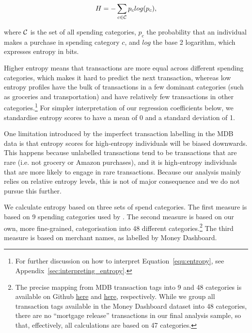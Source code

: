 \begin{equation}
\label{equ:entropy}
H = -\sum_{c \in \mathcal{C}}{p_c}log(p_c),
\end{equation}

\noindent where $\mathcal{C}$ is the set of all spending categories, $p_c$ the
probability that an individual makes a purchase in spending category $c$, and
$log$ the base 2 logarithm, which expresses entropy in bits.

Higher entropy means that transactions are more equal across different spending
categories, which makes it hard to predict the next transaction, whereas low
entropy profiles have the bulk of transactions in a few dominant categories
(such as groceries and transportation) and have relatively few transactions in
other categories.\footnote{For further discussion on how to interpret
Equation~\ref{equ:entropy}, see Appendix~\ref{sec:interpreting_entropy}.} For
simpler interpretation of our regression coefficients below, we standardise
entropy scores to have a mean of 0 and a standard deviation of 1.

One limitation introduced by the imperfect transaction labelling in the
MDB data is that entropy scores for high-entropy individuals will be biased
downwards. This happens because unlabelled transactions tend to be transactions
that are rare (i.e. not grocery or Amazon purchases), and it is high-entropy
individuals that are more likely to engage in rare transactions. Because our
analysis mainly relies on relative entropy levels, this is not of major
consequence and we do not pursue this further.

We calculate entropy based on three sets of spend categories. The first measure
is based on 9 spending categories used by \citet{muggleton2020evidence}. The
second measure is based on our own, more fine-grained, categorisation into 48
different categories.\footnote{The precise mapping from MDB transaction tags
    into 9 and 48 categories is available on Github
    \href{https://github.com/fabiangunzinger/entropy/blob/7fa9c565bf8959ea92a9d4fe2245da0864e19c27/src/data/txn_classifications.py\#L249}{here}
    and
    \href{https://github.com/fabiangunzinger/entropy/blob/7fa9c565bf8959ea92a9d4fe2245da0864e19c27/src/data/txn_classifications.py\#L503}{here},
    respectively. While we group all transaction tags available in the Money
    Dashboard dataset into 48 categories, there are no ``mortgage release''
transactions in our final analysis sample, so that, effectively, all
calculations are based on 47 categories.} The third measure is based on
merchant names, as labelled by Money Dashboard.

